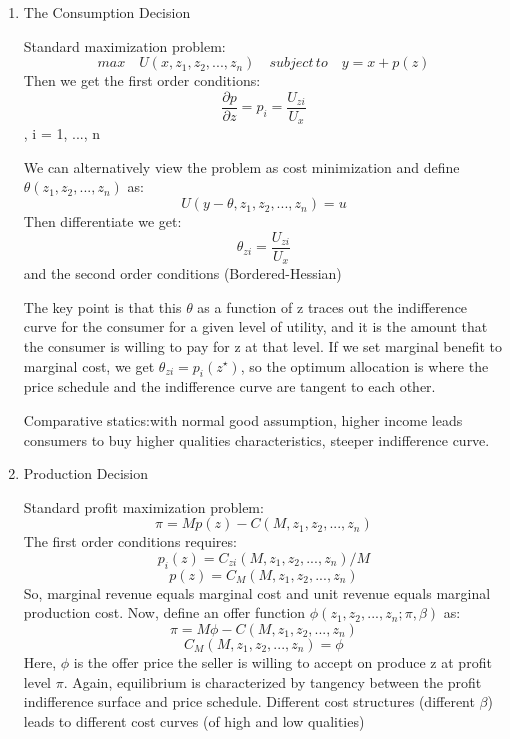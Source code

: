 \documentclass[11pt]{article}
\newcommand{\deldel}[2]{ \frac{ \partial #1}{\partial #2}}  %
\newcommand{\ratioone}{\frac{U_{zi}}{U_x}}
\newcommand{\z}{z_1,z_2,..., z_n}
\begin{document}
\begin{enumerate} [A]
	\item The Consumption Decision
	
	Standard maximization problem:
 	$$ max \quad U\left(x, z_1, z_2, ... , z_n\right) \quad subject \, to \quad y = x + p\left(z\right)$$
	Then we get the first order conditions:
	$$ \deldel{p}{z} = p_i = \ratioone$$ , i = 1, ..., n
	
	We can alternatively view the problem as cost minimization and define $\theta \left(	\z\right)$ as:
	$$ U\left( y - \theta , \z \right) = u$$ 
	Then differentiate  we get:
	$$ \theta_{zi} = \ratioone$$
	and the second order conditions (Bordered-Hessian)
	
	The key point is that this $\theta$ as a function of z traces out the indifference curve for the consumer for a given level of utility, and it is the amount that the consumer is willing to pay for z at that level. If we set marginal benefit to marginal cost, we get $ \theta_{zi} = p_i\left(z^{\star}\right)$, so the optimum allocation is where the price schedule and the indifference curve are tangent to each other.
	
	Comparative statics:with normal good assumption, higher income leads consumers to buy higher qualities characteristics, steeper indifference curve. 
	
	\item Production Decision
	
	Standard profit maximization problem:
	$$ \pi = Mp\left(z\right) - C\left(M, \z\right)$$
	The first order conditions requires:
	$$p_i\left(z\right) = C_{zi}\left(M, \z\right)/M$$
	$$p\left(z\right) = C_M\left(M, \z\right)$$
	So, marginal revenue equals marginal cost and unit revenue equals marginal production cost.
	Now, define an offer function $\phi\left(\z;\pi, \beta\right)$ as:
	$$\pi = M\phi - C\left(M, \z\right)$$
	$$C_M\left(M, \z\right) = \phi$$
	Here, $\phi$ is the offer price the seller is willing to accept on produce z at profit level $\pi$. Again, equilibrium is characterized by tangency between the profit indifference surface and price schedule. 
	Different cost structures (different $\beta$) leads to different cost curves (of high and low qualities)
	
\end{enumerate}
\end{document}
